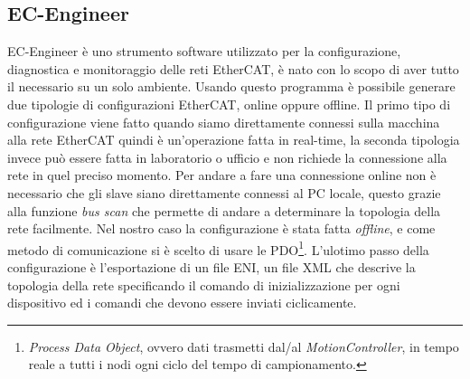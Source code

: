 \subsection{EC-Engineer}
EC-Engineer è uno strumento software utilizzato per la configurazione, diagnostica e monitoraggio delle reti EtherCAT, è nato con lo scopo di aver tutto il necessario su un solo ambiente. Usando questo programma è possibile generare due tipologie di configurazioni EtherCAT, online oppure offline. Il primo tipo di configurazione viene fatto quando siamo direttamente connessi sulla macchina alla rete EtherCAT quindi è un'operazione fatta in real-time, la seconda tipologia invece può essere fatta in laboratorio o ufficio e non richiede la connessione alla rete in quel preciso momento. Per andare a fare una connessione online non è necessario che gli slave siano direttamente connessi al PC locale, questo grazie alla funzione \textit{bus scan} che permette di andare a determinare la topologia della rete facilmente. Nel nostro caso la configurazione è stata fatta \textit{offline}, e come metodo di comunicazione si è scelto di usare le PDO\footnote{\textit{Process Data Object}, ovvero dati trasmetti dal/al \textit{MotionController}, in tempo reale a tutti i nodi ogni ciclo del tempo di campionamento.}. L'ulotimo passo della configurazione è l'esportazione di un file ENI, un file XML che descrive la topologia della rete specificando il comando di inizializzazione per ogni dispositivo ed i comandi che devono essere inviati ciclicamente.

